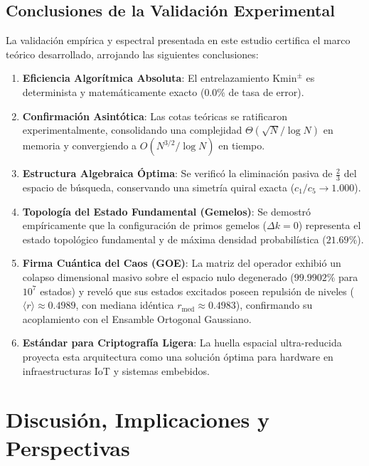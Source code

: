 \documentclass{article}
\numberwithin{equation}{section}
\theoremstyle{plain}
\theoremstyle{definition}
\begin{document}
\subsection{Conclusiones de la Validación Experimental}

La validación empírica y espectral presentada en este estudio certifica el marco teórico desarrollado, arrojando las siguientes conclusiones:

\begin{enumerate}
    \item \textbf{Eficiencia Algorítmica Absoluta}: El entrelazamiento $\mathrm{Kmin}^\pm$ es determinista y matemáticamente exacto ($0.0\%$ de tasa de error).
    \item \textbf{Confirmación Asintótica}: Las cotas teóricas se ratificaron experimentalmente, consolidando una complejidad $\Theta(\sqrt{N}/\log N)$ en memoria y convergiendo a $O(N^{3/2}/\log N)$ en tiempo.
    \item \textbf{Estructura Algebraica Óptima}: Se verificó la eliminación pasiva de $\frac{2}{3}$ del espacio de búsqueda, conservando una simetría quiral exacta ($c_1/c_5 \to 1.000$).
    \item \textbf{Topología del Estado Fundamental (Gemelos)}: Se demostró empíricamente que la configuración de primos gemelos ($\Delta k = 0$) representa el estado topológico fundamental y de máxima densidad probabilística ($21.69\%$).
    \item \textbf{Firma Cuántica del Caos (GOE)}: La matriz del operador exhibió un colapso dimensional masivo sobre el espacio nulo degenerado ($99.9902\%$ para $10^7$ estados) y reveló que sus estados excitados poseen repulsión de niveles ($\langle r \rangle \approx 0.4989$, con mediana idéntica $r_{\text{med}} \approx 0.4983$), confirmando su acoplamiento con el Ensamble Ortogonal Gaussiano.
    \item \textbf{Estándar para Criptografía Ligera}: La huella espacial ultra-reducida proyecta esta arquitectura como una solución óptima para hardware en infraestructuras IoT y sistemas embebidos.
\end{enumerate}


\section{Discusión, Implicaciones y Perspectivas}
\label{sec:discusion-conclusiones}
\end{document}
